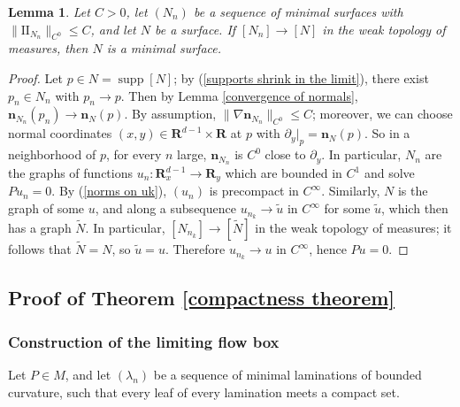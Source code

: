 \documentclass[reqno,11pt]{amsart}
\newcommand{\RR}{\mathbf{R}}
\DeclareMathOperator{\supp}{supp}
\newcommand{\Two}{\mathrm{I\!I}}
\newcommand{\normal}{\mathbf n}
\newtheorem{lemma}[theorem]{Lemma}
\theoremstyle{definition}
\numberwithin{equation}{section}
\begin{document}
\begin{lemma}\label{measured convergence is smooth convergence}
Let $C > 0$, let $(N_n)$ be a sequence of minimal surfaces with $\|\Two_{N_n}\|_{C^0} \leq C$, and let $N$ be a surface.
If $[N_n] \to [N]$ in the weak topology of measures, then $N$ is a minimal surface.
\end{lemma}
\begin{proof}
Let $p \in N = \supp [N]$; by (\ref{supports shrink in the limit}), there exist $p_n \in N_n$ with $p_n \to p$.
Then by Lemma \ref{convergence of normals}, $\normal_{N_n}(p_n) \to \normal_N(p)$.
By assumption, $\|\nabla \normal_{N_n}\|_{C^0} \leq C$; moreover, we can choose normal coordinates $(x, y) \in \RR^{d - 1} \times \RR$ at $p$ with $\partial_y|_p = \normal_N(p)$.
So in a neighborhood of $p$, for every $n$ large, $\normal_{N_n}$ is $C^0$ close to $\partial_y$.
In particular, $N_n$ are the graphs of functions $u_n: \RR^{d - 1}_x \to \RR_y$ which are bounded in $C^1$ and solve $Pu_n = 0$.
By (\ref{norms on uk}), $(u_n)$ is precompact in $C^\infty$.
Similarly, $N$ is the graph of some $u$, and along a subsequence $u_{n_k} \to \tilde u$ in $C^\infty$ for some $\tilde u$, which then has a graph $\tilde N$.
In particular, $[N_{n_k}] \to [\tilde N]$ in the weak topology of measures; it follows that $\tilde N = N$, so $\tilde u = u$.
Therefore $u_{n_k} \to u$ in $C^\infty$, hence $Pu = 0$.
\end{proof}


\subsection{Proof of Theorem \texorpdfstring{\ref{compactness theorem}}{B}}
\subsubsection{Construction of the limiting flow box}
Let $P \in M$, and let $(\lambda_n)$ be a sequence of minimal laminations of bounded curvature, such that every leaf of every lamination meets a compact set.
\end{document}

